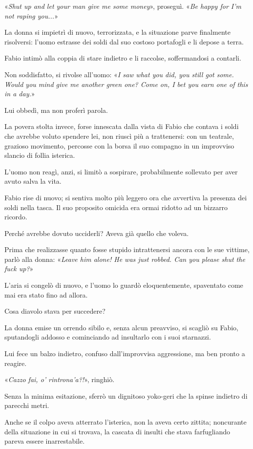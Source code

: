 «\emph{Shut up and let your man give me some money}», proseguì. «\emph{Be happy for I'm not raping you...}»

La donna si impietrì di nuovo, terrorizzata, e la situazione parve finalmente risolversi: l'uomo estrasse dei soldi dal suo costoso portafogli e li depose a terra.

Fabio intimò alla coppia di stare indietro e li raccolse, soffermandosi a contarli.

Non soddisfatto, si rivolse all'uomo: «\emph{I saw what you did, you still got some. Would you mind give me another green one? Come on, I bet you earn one of this in a day.}»

Lui obbedì, ma non proferì parola.

La povera stolta invece, forse innescata dalla vista di Fabio che contava i soldi che avrebbe voluto spendere lei, non riuscì più a trattenersi: con un teatrale, grazioso movimento, percosse con la borsa il suo compagno in un improvviso slancio di follia isterica.

L'uomo non reagì, anzi, si limitò a sospirare, probabilmente sollevato per aver avuto salva la vita.

Fabio rise di nuovo; si sentiva molto più leggero ora che avvertiva la presenza dei soldi nella tasca. Il suo proposito omicida era ormai ridotto ad un bizzarro ricordo.

Perché avrebbe dovuto ucciderli? Aveva già quello che voleva.

Prima che realizzasse quanto fosse stupido intrattenersi ancora con le sue vittime, parlò alla donna: «\emph{Leave him alone! He was just robbed. Can you please shut the fuck up?}»

L'aria si congelò di nuovo, e l'uomo lo guardò eloquentemente, spaventato come mai era stato fino ad allora.

Cosa diavolo stava per succedere?

La donna emise un orrendo sibilo e, senza alcun preavviso, si scagliò su Fabio, sputandogli addosso e cominciando ad insultarlo con i suoi starnazzi.

Lui fece un balzo indietro, confuso dall'improvvisa aggressione, ma ben pronto a reagire.

«\emph{Cazzo fai, o' rintrona'a?!}», ringhiò.

Senza la minima esitazione, sferrò un dignitoso yoko-geri che la spinse indietro di parecchi metri.

Anche se il colpo aveva atterrato l'isterica, non la aveva certo zittita; noncurante della situazione in cui si trovava, la cascata di insulti che stava farfugliando pareva essere inarrestabile.

